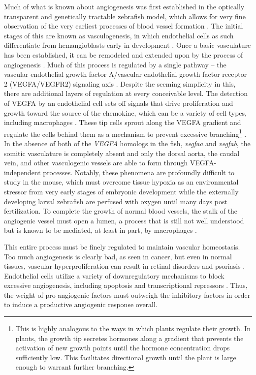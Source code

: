 Much of what is known about angiogenesis was first established in the optically transparent and genetically tractable zebrafish model, which allows for very fine observation of the very earliest processes of blood vessel formation \citep{Chan2002, Chavez2016}. The initial stages of this are known as vasculogenesis, in which endothelial cells as such differentiate from hemangioblasts early in development \citep{Vogeli2006, Bertrand2009}. Once a basic vasculature has been established, it can be remodeled and extended upon by the process of angiogenesis \citep{Koch2012}. Much of this process is regulated by a single pathway -- the vascular endothelial growth factor A/vascular endothelial growth factor receptor 2 (VEGFA/VEGFR2) signaling axis \citep{Olsson2006, Chung2011, Villanueva2016}. Despite the seeming simplicity in this, there are additional layers of regulation at every conceivable level. The detection of VEGFA by an endothelial cell sets off signals that drive proliferation and growth toward the source of the chemokine, which can be a variety of cell types, including macrophages \citep{Olsson2006}. These tip cells sprout along the VEGFA gradient and regulate the cells behind them as a mechanism to prevent excessive branching\footnote{This is highly analogous to the ways in which plants regulate their growth. In plants, the growth tip secretes hormones along a gradient that prevents the activation of new growth points until the hormone concentration drops sufficiently low. This facilitates directional growth until the plant is large enough to warrant further branching.} \citep{Sakabe2017, Tammela2011}. In the absence of both of the \textit{VEGFA} homologs in the fish, \textit{vegfaa} and \textit{vegfab}, the somitic vasculature is completely absent and only the dorsal aorta, the caudal vein, and other vasculogenic vessels are able to form through VEGFA\hyp{}independent processes. Notably, these phenomena are profoundly difficult to study in the mouse, which must overcome tissue hypoxia as an environmental stressor from very early stages of embryonic development while the externally developing larval zebrafish are perfused with oxygen until many days post fertilization. To complete the growth of normal blood vessels, the stalk of the angiogenic vessel must open a lumen, a process that is still not well understood but is known to be mediated, at least in part, by macrophages \citep{Gerri2017}. 

This entire process must be finely regulated to maintain vascular homeostasis. Too much angiogenesis is clearly bad, as seen in cancer, but even in normal tissues, vascular hyperproliferation can result in retinal disorders and psoriasis \citep{Bisht2010, Malecic2017, Gupta2005}. Endothelial cells utilize a variety of downregulatory mechanisms to block excessive angiogenesis, including apoptosis and transcriptional repressors \citep{BenShoham2012, Chavakis2002, GarciaBarros2003, Duval2003, Dimmeler2002, Stefanec2000}. Thus, the weight of pro\hyp{}angiogenic factors must outweigh the inhibitory factors in order to induce a productive angiogenic response overall. 

